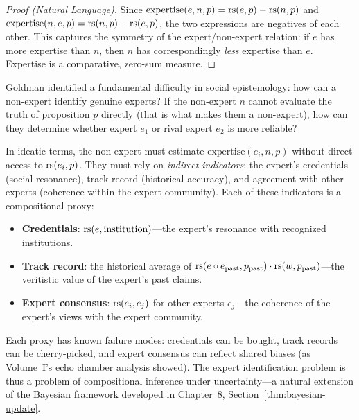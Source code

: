 \begin{proof}[Proof (Natural Language)]
Since $\mathrm{expertise}(e, n, p) = \mathrm{rs}(e, p) - \mathrm{rs}(n, p)$ and
$\mathrm{expertise}(n, e, p) = \mathrm{rs}(n, p) - \mathrm{rs}(e, p)$, the two expressions
are negatives of each other. This captures the symmetry of the expert/non-expert
relation: if $e$ has more expertise than $n$, then $n$ has correspondingly
\emph{less} expertise than $e$. Expertise is a comparative, zero-sum measure.
\end{proof}

\begin{remark}
Goldman identified a fundamental difficulty in social epistemology: how can a
non-expert identify genuine experts? If the non-expert $n$ cannot evaluate the
truth of proposition $p$ directly (that is what makes them a non-expert), how
can they determine whether expert $e_1$ or rival expert $e_2$ is more reliable?

In ideatic terms, the non-expert must estimate $\mathrm{expertise}(e_i, n, p)$
without direct access to $\mathrm{rs}(e_i, p)$. They must rely on \emph{indirect indicators}:
the expert's credentials (social resonance), track record (historical accuracy),
and agreement with other experts (coherence within the expert community). Each of
these indicators is a compositional proxy:

\begin{itemize}
\item \textbf{Credentials}: $\mathrm{rs}(e, \text{institution})$---the expert's resonance
  with recognized institutions.
\item \textbf{Track record}: the historical average of $\mathrm{rs}(e \circ e_{\text{past}},
  p_{\text{past}}) \cdot \mathrm{rs}(w, p_{\text{past}})$---the veritistic value of the
  expert's past claims.
\item \textbf{Expert consensus}: $\mathrm{rs}(e_i, e_j)$ for other experts $e_j$---the
  coherence of the expert's views with the expert community.
\end{itemize}

Each proxy has known failure modes: credentials can be bought, track records can
be cherry-picked, and expert consensus can reflect shared biases (as Volume~I's
echo chamber analysis showed). The expert identification problem is thus a problem
of compositional inference under uncertainty---a natural extension of the Bayesian
framework developed in Chapter~8, Section~\ref{thm:bayesian-update}.
\end{remark}

